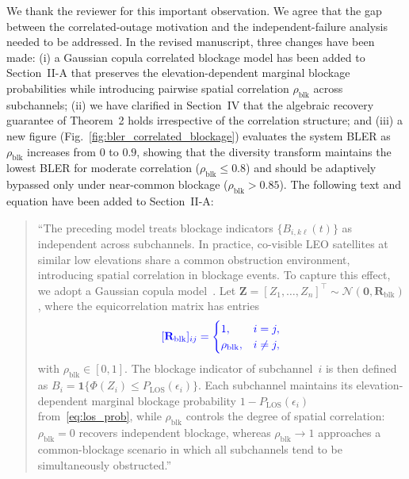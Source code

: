 We thank the reviewer for this important observation. We agree that the gap between the correlated-outage motivation and the independent-failure analysis needed to be addressed. In the revised manuscript, three changes have been made: (i) a Gaussian copula correlated blockage model has been added to Section~II-A that preserves the elevation-dependent marginal blockage probabilities while introducing pairwise spatial correlation $\rho_{\mathrm{blk}}$ across subchannels; (ii) we have clarified in Section~IV that the algebraic recovery guarantee of Theorem~2 holds irrespective of the correlation structure; and (iii) a new figure (Fig.~\ref{fig:bler_correlated_blockage}) evaluates the system BLER as $\rho_{\mathrm{blk}}$ increases from $0$ to $0.9$, showing that the diversity transform maintains the lowest BLER for moderate correlation ($\rho_{\mathrm{blk}} \leq 0.8$) and should be adaptively bypassed only under near-common blockage ($\rho_{\mathrm{blk}} > 0.85$). The following text and equation have been added to Section~II-A:

\begin{quote}
``{\color{blue}The preceding model treats blockage indicators
$\{B_{i,k\ell}(t)\}$ as independent across subchannels. In practice,
co-visible LEO satellites at similar low elevations share a common
obstruction environment, introducing spatial correlation in blockage
events. To capture this effect, we adopt a Gaussian copula model~\cite{Nelsen2006, Ghadi2021}. Let
$\mathbf{Z} = [Z_1, \ldots, Z_n]^\top \sim
\mathcal{N}(\mathbf{0}, \mathbf{R}_{\mathrm{blk}})$,
where the equicorrelation matrix has entries}
\begin{equation*}
\color{blue}
[\mathbf{R}_{\mathrm{blk}}]_{ij} = \begin{cases}
1, & i = j, \\
\rho_{\mathrm{blk}}, & i \neq j,
\end{cases}
\end{equation*}
{\color{blue}with $\rho_{\mathrm{blk}} \in [0,1]$. The blockage indicator of
subchannel~$i$ is then defined as
$B_i = \mathbf{1}\{\Phi(Z_i) \leq P_{\mathrm{LOS}}(\epsilon_i)\}$.
Each subchannel maintains its elevation-dependent marginal
blockage probability
$1 - P_{\mathrm{LOS}}(\epsilon_i)$ from~\eqref{eq:los_prob}, while
$\rho_{\mathrm{blk}}$ controls the degree of spatial correlation:
$\rho_{\mathrm{blk}} = 0$ recovers independent blockage, whereas
$\rho_{\mathrm{blk}} \to 1$ approaches a common-blockage scenario in
which all subchannels tend to be simultaneously obstructed.}''
\end{quote}

